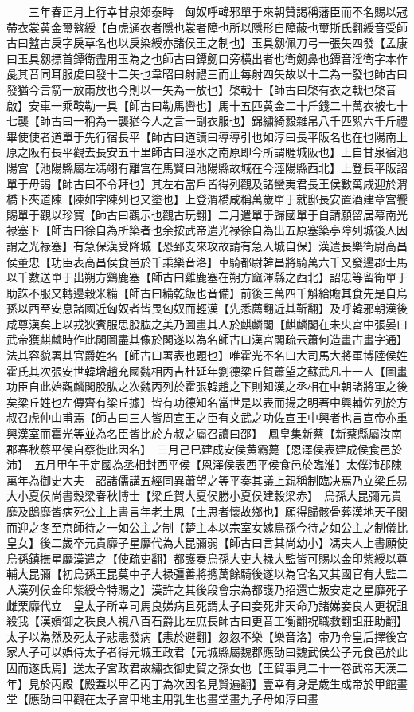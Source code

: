 　　三年春正月上行幸甘泉郊泰畤　匈奴呼韓邪單于來朝贊謁稱藩臣而不名賜以冠帶衣裳黄金璽盭綬【白虎通衣者隱也裳者障也所以隱形自障蔽也璽斯氏翻綬音受師古曰盭古戾字戾草名也以戾染綬亦諸侯王之制也】玉具劔佩刀弓一張矢四發【孟康曰玉具劔摽首鐔衛盡用玉為之也師古曰鐔劒口旁横出者也衛劒鼻也鐔音淫衛字本作彘其音同耳服䖍曰發十二矢也韋昭曰射禮三而止每射四矢故以十二為一發也師古曰發猶今言箭一放兩放也今則以一矢為一放也】棨戟十【師古曰棨有衣之戟也棨音啟】安車一乘鞍勒一具【師古曰勒馬轡也】馬十五匹黄金二十斤錢二十萬衣被七十七襲【師古曰一稱為一襲猶今人之言一副衣服也】錦繡綺縠雜帛八千匹絮六千斤禮畢使使者道單于先行宿長平【師古曰道讀曰導導引也如淳曰長平阪名也在也陽南上原之阪有長平觀去長安五十里師古曰涇水之南原即今所謂睚城阪也】上自甘泉宿池陽宫【池陽縣屬左馮翊有離宫在馬賢曰池陽縣故城在今涇陽縣西北】上登長平阪詔單于毋謁【師古曰不令拜也】其左右當戶皆得列觀及諸蠻夷君長王侯數萬咸迎於渭橋下夾道陳【陳如字陳列也又塗也】上登渭橋咸稱萬歲單于就邸長安置酒建章宫饗賜單于觀以珍寶【師古曰觀示也觀古玩翻】二月遣單于歸國單于自請願留居幕南光禄塞下【師古曰徐自為所築者也余按武帝遣光禄徐自為出五原塞築亭障列城後人因謂之光禄塞】有急保漢受降城【恐郅支來攻故請有急入城自保】漢遣長樂衛尉高昌侯董忠【功臣表高昌侯食邑於千乘樂音洛】車騎都尉韓昌將騎萬六千又發邊郡士馬以千數送單于出朔方鷄鹿塞【師古曰雞鹿塞在朔方窳渾縣之西北】詔忠等留衛單于助誅不服又轉邊穀米糒【師古曰糒乾飯也音備】前後三萬四千斛給贍其食先是自烏孫以西至安息諸國近匈奴者皆畏匈奴而輕漢【先悉薦翻近其靳翻】及呼韓邪朝漢後咸尊漢矣上以戎狄賓服思股肱之美乃圖畫其人於麒麟閣【麒麟閣在未央宮中張晏曰武帝獲麒麟時作此閣圖盡其像於閣遂以為名師古曰漢宮閣疏云蕭何造畫古畫字通】法其容貌署其官爵姓名【師古曰署表也題也】唯霍光不名曰大司馬大將軍博陸侯姓霍氏其次張安世韓增趙充國魏相丙吉杜延年劉德梁丘賀蕭望之蘇武凡十一人【圖畫功臣自此始觀麟閣股肱之次魏丙列於霍張韓趙之下則知漢之丞相在中朝諸將軍之後矣梁丘姓也左傳齊有梁丘據】皆有功德知名當世是以表而揚之明著中興輔佐列於方叔召虎仲山甫焉【師古曰三人皆周宣王之臣有文武之功佐宣王中興者也言宣帝亦重興漢室而霍光等並為名臣皆比於方叔之屬召讀曰邵】　鳳皇集新蔡【新蔡縣屬汝南郡春秋蔡平侯自蔡徙此因名】　三月己巳建成安侯黄霸薨【恩澤侯表建成侯食邑於沛】　五月甲午于定國為丞相封西平侯【恩澤侯表西平侯食邑於臨淮】太僕沛郡陳萬年為御史大夫　詔諸儒講五經同異蕭望之等平奏其議上親稱制臨决焉乃立梁丘易大小夏侯尚書穀梁春秋博士【梁丘賀大夏侯勝小夏侯建穀梁赤】　烏孫大昆彌元貴靡及鴟靡皆病死公主上書言年老土思【土思者懷故鄉也】願得歸骸骨葬漢地天子閔而迎之冬至京師待之一如公主之制【楚主本以宗室女嫁烏孫今待之如公主之制儀比皇女】後二歲卒元貴靡子星靡代為大昆彌弱【師古曰言其尚幼小】馮夫人上書願使烏孫鎮撫星靡漢遣之【使疏吏翻】都護奏烏孫大吏大禄大監皆可賜以金印紫綬以尊輔大昆彌【初烏孫王昆莫中子大禄彊善將摠萬餘騎後遂以為官名又其國官有大監二人漢列侯金印紫綬今特賜之】漢許之其後段會宗為都護乃招還亡叛安定之星靡死子雌栗靡代立　皇太子所幸司馬良娣病且死謂太子曰妾死非天命乃諸娣妾良人更祝詛殺我【漢嬪御之秩良人視八百石爵比左庶長師古曰更音工衡翻祝職救翻詛莊助翻】太子以為然及死太子悲恚發病【恚於避翻】忽忽不樂【樂音洛】帝乃令皇后擇後宫家人子可以娯侍太子者得元城王政君【元城縣屬魏郡應劭曰魏武侯公子元食邑於此因而遂氏焉】送太子宮政君故繡衣御史賀之孫女也【王賀事見二十一卷武帝天漢二年】見於丙殿【殿蓋以甲乙丙丁為次因名見賢遍翻】壹幸有身是歲生成帝於甲館畫堂【應劭曰甲觀在太子宮甲地主用乳生也畫堂畫九子母如淳曰畫
